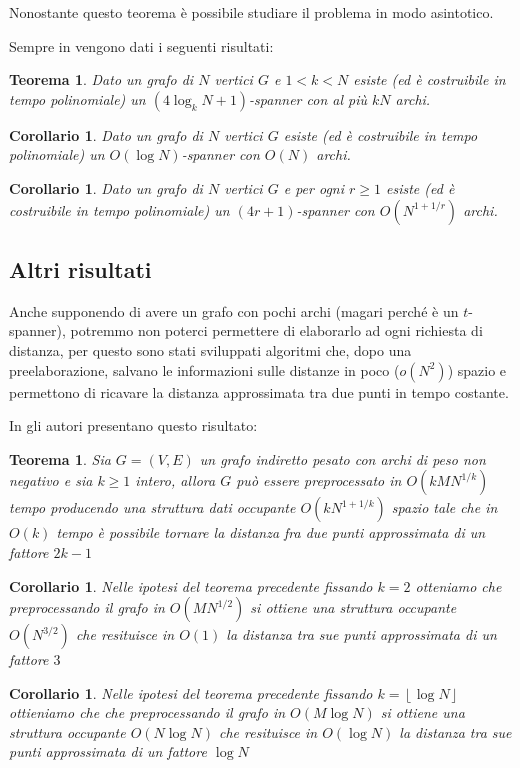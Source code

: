 \documentclass[a4paper,10pt]{amsbook}
\newcounter{counter1}
\theoremstyle{plain}
\newtheorem{myteo}[counter1]{Teorema}
\newtheorem{mycor}[counter1]{Corollario}
\theoremstyle{definition}
\theoremstyle{remark}
\newcommand{\pa}[1]{\left(#1\right)}
\newcommand{\floor}[1]{\left\lfloor#1\right\rfloor}
\begin{document}
Nonostante questo teorema \`e possibile studiare il problema in modo
asintotico.

Sempre in \cite{graphspanners} vengono dati i seguenti risultati:

\begin{myteo}
  Dato un grafo di $N$ vertici $G$ e $1<k<N$ esiste (ed \`e
  costruibile in tempo polinomiale) un $(4\log _k N +1)$-spanner con
  al pi\`u $kN$ archi.
\end{myteo}

\begin{mycor}
  Dato un grafo di $N$ vertici $G$ esiste (ed \`e costruibile in tempo
  polinomiale) un $O\pa{\log N}$-spanner con $O(N)$ archi.
\end{mycor}

\begin{mycor}
  Dato un grafo di $N$ vertici $G$ e per ogni $r\ge 1$ esiste (ed \`e
  costruibile in tempo polinomiale) un $(4r+1)$-spanner con
  $O(N^{1+1/r})$ archi.
\end{mycor}


\subsection{Altri risultati}

Anche supponendo di avere un grafo con pochi archi (magari perch\'e è
un $t$-spanner), potremmo non poterci permettere di elaborarlo ad ogni
richiesta di distanza, per questo sono stati sviluppati algoritmi che,
dopo una preelaborazione, salvano le informazioni sulle distanze in
poco ($o(N^2)$) spazio e permettono di ricavare la distanza
approssimata tra due punti in tempo costante.

In \cite{appdistoracl} gli autori presentano questo risultato:
\begin{myteo}
  Sia $G = (V,E)$ un grafo indiretto pesato con archi di peso non
  negativo e sia $k\ge 1$ intero, allora $G$ pu\`o essere
  preprocessato in $O\pa{kMN^{1/k}}$ tempo producendo una struttura
  dati occupante $O\pa{kN^{1+1/k}}$ spazio tale che in $O\pa{k}$ tempo
  \`e possibile tornare la distanza fra due punti approssimata di un
  fattore $2k-1$
\end{myteo}
\begin{mycor}
  Nelle ipotesi del teorema precedente fissando $k=2$ otteniamo che
  preprocessando il grafo in $O\pa{MN^{1/2}}$ si ottiene una struttura
  occupante $O\pa{N^{3/2}}$ che resituisce in $O\pa{1}$ la distanza
  tra sue punti approssimata di un fattore $3$
\end{mycor}
\begin{mycor}
  Nelle ipotesi del teorema precedente fissando $k=\floor{\log N}$ ottieniamo
  che che preprocessando il grafo in $O\pa{M\log N}$ si ottiene una
  struttura occupante $O\pa{N\log{N}}$ che resituisce in $O\pa{\log N}$ la
  distanza tra sue punti approssimata di un fattore $\log N$
\end{mycor}
\end{document}
